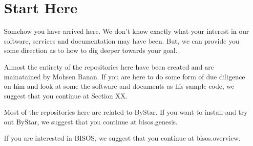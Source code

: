 \section{Start Here}

Somehow you have arrived here. We don't know exactly what your
interest in our software, services and documentation may have been.
But, we can provide you some direction as to how to dig deeper towards
your goal.

Almost the entirety of the repositories here have been created and are
mainatained by Mohsen Banan. If you are here to do some form of due
diligence on him and look at some the software and documents as his
sample code, we suggest that you continue at Section XX.

Most of the repositories here are related to ByStar. If you want to
install and try out ByStar, we suggest that you continue at bisos.genesis.

If you are interested in BISOS, we suggest that you continue at bisos.overview.


\begin{comment}
*  [[elisp:(org-cycle)][| ]]  [[elisp:(blee:ppmm:org-mode-toggle)][Nat]] [[elisp:(beginning-of-buffer)][Top]] [[elisp:(delete-other-windows)][(1)]] || /DBLOCK: *NO* Table Of Contents/  ::  [[elisp:(org-cycle)][| ]]
\end{comment}




\begin{comment}
*  [[elisp:(org-cycle)][| ]]  Local Vars  ::                  *Org-Mode And Emacs Specific Configurations*   [[elisp:(org-cycle)][| ]]
\end{comment}


\begin{comment}
*  [[elisp:(org-cycle)][| ]]  [[elisp:(blee:ppmm:org-mode-toggle)][Nat]] EndOfFileVars ::  *DBLK: Org-Mode And Emacs Specific Configurations*   [[elisp:(org-cycle)][| ]]
\end{comment}


